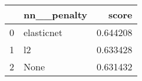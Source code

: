 \begin{tabular}{llr}
\toprule
{} & nn\_\_penalty &     score \\
\midrule
0 &  elasticnet &  0.644208 \\
1 &          l2 &  0.633428 \\
2 &        None &  0.631432 \\
\bottomrule
\end{tabular}
